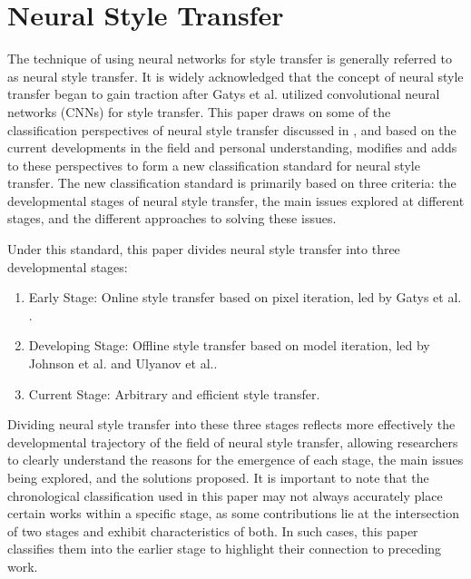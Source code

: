 \section{Neural Style Transfer}

The technique of using neural networks for style transfer is generally referred to as neural style transfer. It is widely acknowledged that the concept of neural style transfer began to gain traction after Gatys et al.\citep{02gatys2016image} utilized convolutional neural networks (CNNs) for style transfer. This paper draws on some of the classification perspectives of neural style transfer discussed in \citep{01jing2019neural}, and based on the current developments in the field and personal understanding, modifies and adds to these perspectives to form a new classification standard for neural style transfer. The new classification standard is primarily based on three criteria: the developmental stages of neural style transfer, the main issues explored at different stages, and the different approaches to solving these issues.

Under this standard, this paper divides neural style transfer into three developmental stages:
\begin{enumerate}
    \item Early Stage: Online style transfer based on pixel iteration, led by Gatys et al. \citep{02gatys2016image}.
    \item Developing Stage: Offline style transfer based on model iteration, led by Johnson et al.\citep{22johnson2016perceptual} and Ulyanov et al.\citep{23ulyanov2016texture}.
    \item Current Stage: Arbitrary and efficient style transfer.
\end{enumerate}

Dividing neural style transfer into these three stages reflects more effectively the developmental trajectory of the field of neural style transfer, allowing researchers to clearly understand the reasons for the emergence of each stage, the main issues being explored, and the solutions proposed. It is important to note that the chronological classification used in this paper may not always accurately place certain works within a specific stage, as some contributions lie at the intersection of two stages and exhibit characteristics of both. In such cases, this paper classifies them into the earlier stage to highlight their connection to preceding work.

